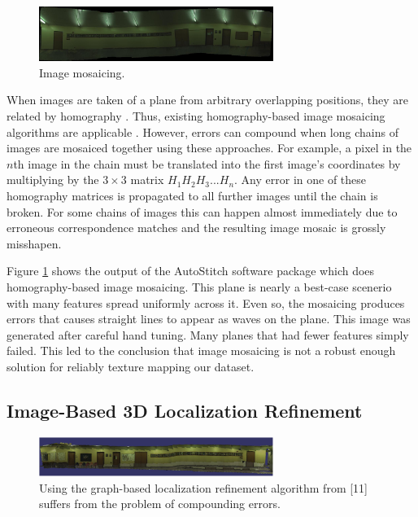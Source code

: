 \documentclass[10pt,twocolumn,letterpaper]{article}
\begin{document}
\begin{figure}
  \centering
  \includegraphics[width=3in]{panoMy.jpg}
  \caption{Image mosaicing. }
  \label{fig:mosaic}
\end{figure}


When images are taken of a plane from arbitrary overlapping positions,
they are related by homography \cite{hz}. Thus, existing
homography-based image mosaicing algorithms are applicable
\cite{brown2007automatic}. However, errors can compound when long
chains of images are mosaiced together using these approaches. For
example, a pixel in the $n$th image in the chain must be translated
into the first image's coordinates by multiplying by the $3\times3$
matrix $H_1 H_2 H_3 ... H_n$. Any error in one of these homography
matrices is propagated to all further images until the chain is
broken. For some chains of images this can happen almost immediately
due to erroneous correspondence matches and the resulting image mosaic
is grossly misshapen.

Figure \ref{fig:mosaic} shows the output of the AutoStitch software
package which does homography-based image mosaicing. This plane is
nearly a best-case scenerio with many features spread uniformly across
it. Even so, the mosaicing produces errors that causes straight lines
to appear as waves on the plane. This image was generated after
careful hand tuning. Many planes that had fewer features simply
failed. This led to the conclusion that image mosaicing is not a
robust enough solution for reliably texture mapping our dataset.

\subsection{Image-Based 3D Localization Refinement}

\begin{figure}
  \centering
  \includegraphics[width=3in]{Graph_crop.pdf}
  \caption{Using the graph-based localization refinement algorithm
    from [11] suffers from the problem of compounding errors. }
  \label{fig:graph}
\end{figure}
\end{document}

